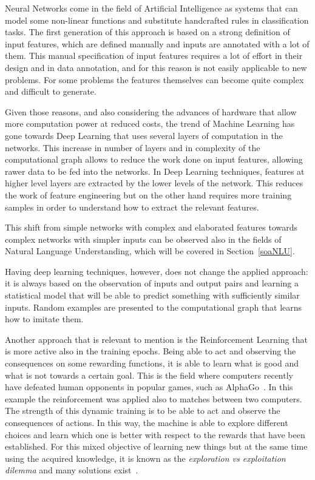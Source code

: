 Neural Networks come in the field of Artificial Intelligence as systems that can model some non-linear functions and substitute handcrafted rules in classification tasks. The first generation of this approach is based on a strong definition of input features, which are defined manually and inputs are annotated with a lot of them. This manual specification of input features requires a lot of effort in their design and in data annotation, and for this reason is not easily applicable to new problems. For some problems the features themselves can become quite complex and difficult to generate.

Given those reasons, and also considering the advances of hardware that allow more computation power at reduced costs, the trend of Machine Learning has gone towards Deep Learning that uses several layers of computation in the networks. This increase in number of layers and in complexity of the computational graph allows to reduce the work done on input features, allowing rawer data to be fed into the networks. In Deep Learning techniques, features at higher level layers are extracted by the lower levels of the network. This reduces the work of feature engineering but on the other hand requires more training samples in order to understand how to extract the relevant features.

This shift from simple networks with complex and elaborated features towards complex networks with simpler inputs can be observed also in the fields of Natural Language Understanding, which will be covered in Section~\ref{soaNLU}.

Having deep learning techniques, however, does not change the applied approach: it is always based on the observation of inputs and output pairs and learning a statistical model that will be able to predict something with sufficiently similar inputs. Random examples are presented to the computational graph that learns how to imitate them.

Another approach that is relevant to mention is the Reinforcement Learning that is more active also in the training epochs. Being able to act and observing the consequences on some rewarding functions, it is able to learn what is good and what is not towards a certain goal. This is the field where computers recently have defeated human opponents in popular games, such as AlphaGo~\cite{chouard2016go}. In this example the reinforcement was applied also to matches between two computers. The strength of this dynamic training is to be able to act and observe the consequences of actions. In this way, the machine is able to explore different choices and learn which one is better with respect to the rewards that have been established. For this mixed objective of learning new things but at the same time using the acquired knowledge, it is known as the \textit{exploration vs exploitation dilemma} and many solutions exist~\cite{tokic2010adaptive}.

